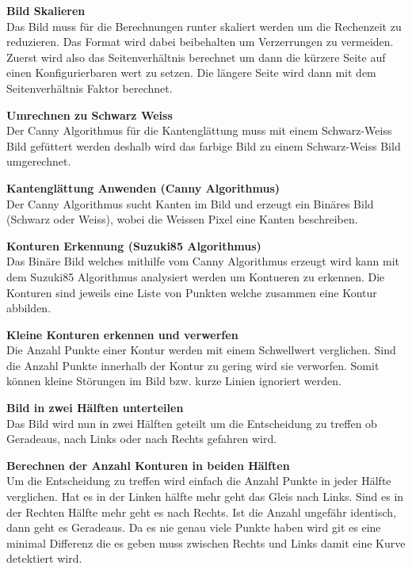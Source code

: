 \documentclass[../../main.tex]{subfiles}
\begin{document}
\textbf{Bild Skalieren}\\
Das Bild muss für die Berechnungen runter skaliert werden um die Rechenzeit zu reduzieren. Das Format
wird dabei beibehalten um Verzerrungen zu vermeiden. Zuerst wird also das Seitenverhältnis berechnet um dann
die kürzere Seite auf einen Konfigurierbaren wert zu setzen. Die längere Seite wird dann mit dem Seitenverhältnis Faktor
berechnet.

\textbf{Umrechnen zu Schwarz Weiss}\\
Der Canny Algorithmus für die Kantenglättung muss mit einem Schwarz-Weiss Bild gefüttert werden deshalb wird das farbige Bild
zu einem Schwarz-Weiss Bild umgerechnet.

\textbf{Kantenglättung Anwenden (Canny Algorithmus)}\\
Der Canny Algorithmus sucht Kanten im Bild und erzeugt ein Binäres Bild (Schwarz oder Weiss), wobei die Weissen Pixel eine Kanten
beschreiben.

\textbf{Konturen Erkennung (Suzuki85 Algorithmus)}\\
Das Binäre Bild welches mithilfe vom Canny Algorithmus erzeugt wird kann mit dem Suzuki85 Algorithmus analysiert werden um Kontueren zu erkennen.
Die Konturen sind jeweils eine Liste von Punkten welche zusammen eine Kontur abbilden.

\textbf{Kleine Konturen erkennen und verwerfen}\\
Die Anzahl Punkte einer Kontur werden mit einem Schwellwert verglichen. Sind die Anzahl Punkte innerhalb der Kontur zu gering wird sie verworfen.
Somit können kleine Störungen im Bild bzw. kurze Linien ignoriert werden.

\textbf{Bild in zwei Hälften unterteilen}\\
Das Bild wird nun in zwei Hälften geteilt um die Entscheidung zu treffen ob Geradeaus, nach Links oder nach Rechts gefahren wird.

\textbf{Berechnen der Anzahl Konturen in beiden Hälften}\\
Um die Entscheidung zu treffen wird einfach die Anzahl Punkte in jeder Hälfte verglichen. Hat es in der Linken hälfte mehr geht das Gleis nach Links.
Sind es in der Rechten Hälfte mehr geht es nach Rechts. Ist die Anzahl ungefähr identisch, dann geht es Geradeaus. Da es nie genau viele Punkte haben wird
git es eine minimal Differenz die es geben muss zwischen Rechts und Links damit eine Kurve detektiert wird.
\end{document}
